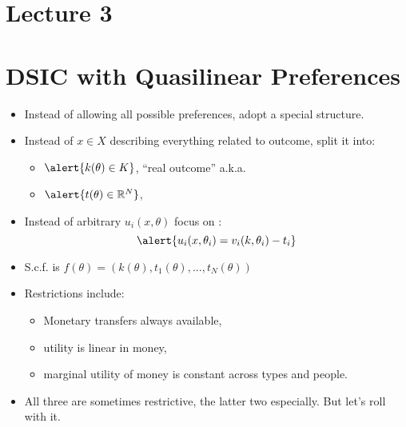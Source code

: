 \documentclass[english]{beamer}		%
\def\lyxframeend{} %
\begin{document}
\maketitle

\section{Lecture 3}

\section{DSIC with Quasilinear Preferences}


\begin{itemize}
	\item Instead of allowing all possible preferences, adopt a special structure.
	\item Instead of $x \in X$ describing everything related to outcome, split it into:
	\begin{itemize}
		\item $\alert{k(\theta) \in K}$, ``real outcome'' a.k.a. 
		\item $\alert{t(\theta) \in \mathbb{R}^N}$, 
	\end{itemize}
	\item Instead of arbitrary $u_i(x,\theta)$ focus on :
	$$\alert{ u_i(x,\theta_i) = v_i(k,\theta_i) - t_i }$$
	\pause\vspace{-1em}
	\item S.c.f. is $f(\theta) = \left( k(\theta), t_1(\theta), ..., t_N(\theta) \right)$
\end{itemize}
\vspace{-2em}
\lyxframeend


\begin{itemize}
	\item Restrictions include:
	\begin{itemize}
		\item Monetary transfers always available,
		\item utility is linear in money,
		\item marginal utility of money is constant across types and people.
	\end{itemize}
	\item All three are sometimes restrictive, the latter two especially. But let's roll with it.
\end{itemize}
\lyxframeend
\end{document}
